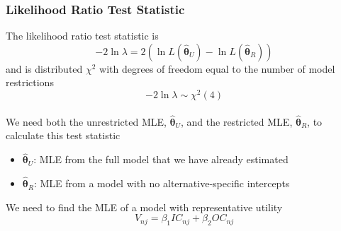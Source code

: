 \documentclass{beamer}\usepackage[]{graphicx}\usepackage[]{xcolor}
\begin{document}
\begin{frame}\frametitle{Likelihood Ratio Test Statistic}
    The likelihood ratio test statistic is
    $$-2 \ln \lambda = 2 \left( \ln L(\widehat{\bm{\theta}}_U) - \ln L(\widehat{\bm{\theta}}_R) \right)$$
    and is distributed $\chi^2$ with degrees of freedom equal to the number of model restrictions
    $$-2 \ln \lambda \sim \chi^2(4)$$ \\
    \vspace{2ex}
    We need both the unrestricted MLE, $\widehat{\bm{\theta}}_U$, and the restricted MLE, $\widehat{\bm{\theta}}_R$, to calculate this test statistic
    \begin{itemize}
    	\item $\widehat{\bm{\theta}}_U$: MLE from the full model that we have already estimated
    	\item $\widehat{\bm{\theta}}_R$: MLE from a model with no alternative-specific intercepts
    \end{itemize}
    \vspace{2ex}
    We need to find the MLE of a model with representative utility
    $$V_{nj} = \beta_1 IC_{nj} + \beta_2 OC_{nj}$$
\end{frame}
\end{document}
